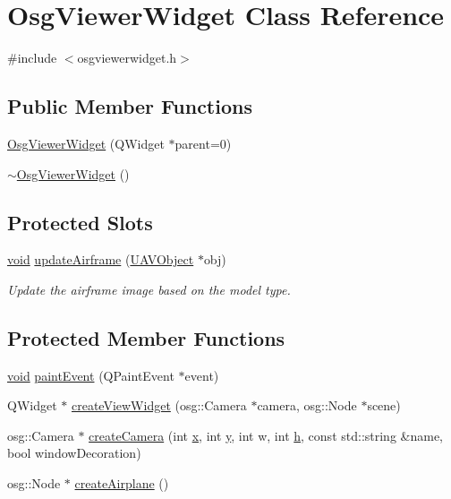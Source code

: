 \hypertarget{class_osg_viewer_widget}{\section{\-Osg\-Viewer\-Widget \-Class \-Reference}
\label{class_osg_viewer_widget}
}


{\ttfamily \#include $<$osgviewerwidget.\-h$>$}

\subsection*{\-Public \-Member \-Functions}
\begin{DoxyCompactItemize}
\item 
\hyperlink{class_osg_viewer_widget_a24ee315fe42989ffd8c20d4bb457537b}{\-Osg\-Viewer\-Widget} (\-Q\-Widget $\ast$parent=0)
\item 
\hyperlink{class_osg_viewer_widget_a6365239e14d9ef063931d419640fc184}{$\sim$\-Osg\-Viewer\-Widget} ()
\end{DoxyCompactItemize}
\subsection*{\-Protected \-Slots}
\begin{DoxyCompactItemize}
\item 
\hyperlink{group___u_a_v_objects_plugin_ga444cf2ff3f0ecbe028adce838d373f5c}{void} \hyperlink{class_osg_viewer_widget_adcfd8d4429bc27110d678b34bf88b695}{update\-Airframe} (\hyperlink{class_u_a_v_object}{\-U\-A\-V\-Object} $\ast$obj)
\begin{DoxyCompactList}\small\item\em \-Update the airframe image based on the model type. \end{DoxyCompactList}\end{DoxyCompactItemize}
\subsection*{\-Protected \-Member \-Functions}
\begin{DoxyCompactItemize}
\item 
\hyperlink{group___u_a_v_objects_plugin_ga444cf2ff3f0ecbe028adce838d373f5c}{void} \hyperlink{class_osg_viewer_widget_a2f98e95c94146ac1a50e9b96eb3119b8}{paint\-Event} (\-Q\-Paint\-Event $\ast$event)
\item 
\-Q\-Widget $\ast$ \hyperlink{class_osg_viewer_widget_a6581a09ccbb973f6572a7e37cad7a41d}{create\-View\-Widget} (osg\-::\-Camera $\ast$camera, osg\-::\-Node $\ast$scene)
\item 
osg\-::\-Camera $\ast$ \hyperlink{class_osg_viewer_widget_ac84d701ec3e19636d8bcb826c60a55c8}{create\-Camera} (int \hyperlink{_o_p_plots_8m_a9336ebf25087d91c818ee6e9ec29f8c1}{x}, int \hyperlink{_o_p_plots_8m_a2fb1c5cf58867b5bbc9a1b145a86f3a0}{y}, int w, int \hyperlink{uavobjecttemplate_8m_a5e36941b3d856737e81516acd45edc50}{h}, const std\-::string \&name, bool window\-Decoration)
\item 
osg\-::\-Node $\ast$ \hyperlink{class_osg_viewer_widget_a98c2d8d6aa1c325dfbfdab015551c6f0}{create\-Airplane} ()
\end{DoxyCompactItemize}


